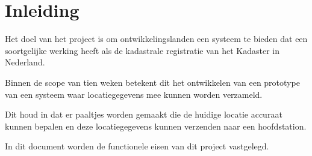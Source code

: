 \section{Inleiding}
Het doel van het project is om ontwikkelingslanden een systeem te bieden dat
een soortgelijke werking heeft als de kadastrale registratie van het Kadaster
in Nederland.

Binnen de scope van tien weken betekent dit het ontwikkelen van een prototype
van een systeem waar locatiegegevens mee kunnen worden verzameld.

Dit houd in dat er paaltjes worden gemaakt die de huidige locatie accuraat
kunnen bepalen en deze locatiegegevens kunnen verzenden naar een hoofdstation.

In dit document worden de functionele eisen van dit project vastgelegd.
